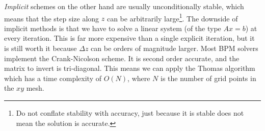 \documentclass[]{article}
\begin{document}
	\textit{Implicit} schemes on the other hand are usually unconditionally stable, which means that the step size along $z$ can be arbitrarily large\footnote{Do not conflate stability with accuracy, just because it is stable does not mean the solution is accurate.}. The downside of implicit methods is that we have to solve a linear system (of the type $Ax=b$) at every iteration. This is far more expensive than a single explicit iteration, but it is still worth it because $\Delta z$ can be orders of magnitude larger. Most BPM solvers implement the Crank-Nicolson scheme. It is second order accurate, and the matrix to invert is tri-diagonal. This means we can apply the Thomas algorithm which has a time complexity of $O(N)$, where $N$ is the number of grid points in the $xy$ mesh.\\
	
\end{document}

